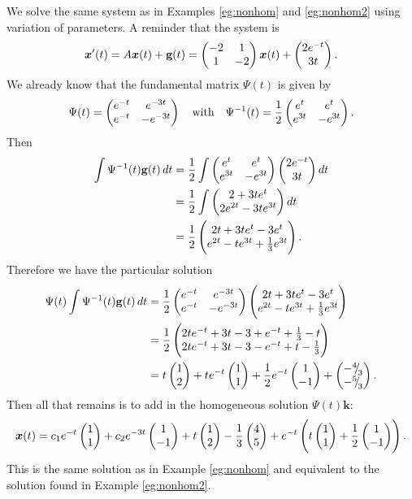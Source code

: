 \begin{eg}\label{eg:nonhom3}
	We solve the same system as in Examples \ref{eg:nonhom} and \ref{eg:nonhom2} using variation of parameters. A reminder that the system is
	\[
	\bm{x}'(t) = A\bm{x}(t) + \textbf{g}(t) = \begin{pmatrix}-2&1\\1&-2\end{pmatrix} \bm{x}(t) + \begin{pmatrix}2e^{-t}\\3t\end{pmatrix}.
	\]
	We already know that the fundamental matrix $\Psi(t)$ is given by
	\[
	\Psi(t) = \begin{pmatrix}e^{-t} & e^{-3t} \\ e^{-t} & -e^{-3t}\end{pmatrix} \quad \text{with} \quad \Psi^{-1}(t) = \frac12 \begin{pmatrix}e^t & e^t \\ e^{3t} & -e^{3t}\end{pmatrix}.
	\]
	Then
	\begin{align*}
		\int \Psi^{-1}(t) \textbf{g}(t) \,dt &= \frac12 \int \begin{pmatrix}e^t & e^t \\ e^{3t} & -e^{3t}\end{pmatrix} \begin{pmatrix}2e^{-t}\\3t\end{pmatrix} dt \\
		&= \frac12 \int \begin{pmatrix}2 + 3te^t \\ 2e^{2t} - 3te^{3t}\end{pmatrix} dt \\
		&= \frac12 \begin{pmatrix}2t + 3te^t - 3e^t \\ e^{2t} - te^{3t} + \frac13 e^{3t}\end{pmatrix}.
	\end{align*}
	Therefore we have the particular solution
	\begin{align*}
		\Psi(t) \int \Psi^{-1}(t) \textbf{g}(t) \,dt &= \frac12 \begin{pmatrix}e^{-t} & e^{-3t} \\ e^{-t} & -e^{-3t}\end{pmatrix} \begin{pmatrix}2t + 3te^t - 3e^t \\ e^{2t} - te^{3t} + \frac13 e^{3t}\end{pmatrix} \\
		&= \frac12 \begin{pmatrix}2te^{-t} + 3t-3+e^{-t} + \frac13 - t \\ 2te^{-t} + 3t - 3 - e^{-t} + t - \frac13\end{pmatrix} \\
		&= t\begin{pmatrix}1\\2\end{pmatrix} + te^{-t}\begin{pmatrix}1\\1\end{pmatrix} + \frac12e^{-t}\begin{pmatrix}1\\-1\end{pmatrix} + \begin{pmatrix}-{}^{4}{\mskip -5mu/\mskip -3mu}_{3} \\ -{}^{5}{\mskip -5mu/\mskip -3mu}_{3}\end{pmatrix}.
	\end{align*}
	Then all that remains is to add in the homogeneous solution $\Psi(t) \bm{k}$:
	\[
		\bm{x}(t) = c_1e^{-t}\begin{pmatrix}1\\1\end{pmatrix} + c_2e^{-3t}\begin{pmatrix}1\\-1\end{pmatrix} + t\begin{pmatrix}1\\2\end{pmatrix} - \frac{1}{3}\begin{pmatrix}4\\5\end{pmatrix} + e^{-t}\left(t\begin{pmatrix}1\\1\end{pmatrix} + \frac12\begin{pmatrix}1\\-1\end{pmatrix} \right).
	\]
	This is the same solution as in Example \ref{eg:nonhom} and equivalent to the solution found in Example \ref{eg:nonhom2}.
\end{eg}

